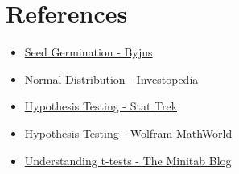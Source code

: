 \documentclass[twocolumn]{article}
\begin{document}
\section{References}
\begin{itemize}
    \item \href{https://byjus.com/biology/seed-germination/}{Seed Germination - Byjus}
    \item \href{https://www.investopedia.com/terms/n/normaldistribution.asp}{Normal Distribution - Investopedia}
    \item \href{https://stattrek.com/hypothesis-test/hypothesis-testing.aspx}{Hypothesis Testing - Stat Trek}
    \item \href{http://mathworld.wolfram.com/HypothesisTesting.html}{Hypothesis Testing - Wolfram MathWorld}
    \item \href{https://blog.minitab.com/blog/adventures-in-statistics-2/understanding-t-tests-1-sample-2-sample-and-paired-t-tests}{Understanding t-tests - The Minitab Blog}
\end{itemize}
\end{document}
